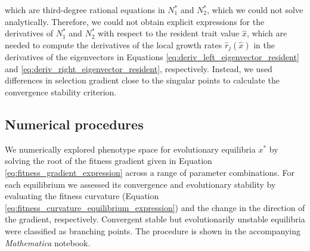 which are third-degree rational equations in $N^*_1$ and $N^*_2$, which we could not solve analytically. Therefore, we could not obtain explicit expressions for the derivatives of $N^*_1$ and $N^*_2$ with respect to the resident trait value $\hat x$, which are needed to compute the derivatives of the local growth rates $\hat r_j(\hat x)$ in the derivatives of the eigenvectors in Equations \ref{eq:deriv_left_eigenvector_resident} and \ref{eq:deriv_right_eigenvector_resident}, respectively. Instead, we used differences in selection gradient close to the singular points to calculate the convergence stability criterion.

\subsection*{Numerical procedures}

We numerically explored phenotype space for evolutionary equilibria $x^*$ by solving the root of the fitness gradient given in Equation \ref{eq:fitness_gradient_expression} across a range of parameter combinations. For each equilibrium we assessed its convergence and evolutionary stability by evaluating the fitness curvature (Equation \ref{eq:fitness_curvature_equilibrium_expression}) and the change in the direction of the gradient, respectively. Convergent stable but evolutionarily unstable equilibria were classified as branching points. The procedure is shown in the accompanying \textit{Mathematica} notebook.
